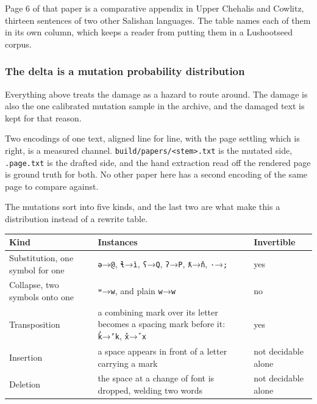 Page 6 of that paper is a comparative appendix in Upper Chehalis and Cowlitz, thirteen sentences of two other Salishan languages. The table names each of them in its own column, which keeps a reader from putting them in a Lushootseed corpus.

\subsubsection{The delta is a mutation probability distribution}

Everything above treats the damage as a hazard to route around. The damage is also the one calibrated mutation sample in the archive, and the damaged text is kept for that reason.

Two encodings of one text, aligned line for line, with the page settling which is right, is a measured channel. \texttt{build/\allowbreak{}papers/\allowbreak{}<stem>.\allowbreak{}txt} is the mutated side, \texttt{.\allowbreak{}page.\allowbreak{}txt} is the drafted side, and the hand extraction read off the rendered page is ground truth for both. No other paper here has a second encoding of the same page to compare against.

The mutations sort into five kinds, and the last two are what make this a distribution instead of a rewrite table.

\tiny
\setlength{\tabcolsep}{2pt}
\begin{longtable}{@{}>{\raggedright\arraybackslash}p{}>{\raggedright\arraybackslash}p{}>{\raggedright\arraybackslash}p{}@{}}
\toprule
Kind & Instances & Invertible \\
\midrule
Substitution, one symbol for one & \texttt{ə}→\texttt{@}, \texttt{ɬ}→\texttt{ì}, \texttt{ʕ}→\texttt{Q}, \texttt{ʔ}→\texttt{P}, \texttt{ƛ}→\texttt{ň}, \texttt{·}→\texttt{;} & yes \\
Collapse, two symbols onto one & \texttt{ʷ}→\texttt{w}, and plain \texttt{w}→\texttt{w} & no \\
Transposition & a combining mark over its letter becomes a spacing mark before it: \texttt{k̓}→\texttt{’k}, \texttt{x̌}→\texttt{ˇx} & yes \\
Insertion & a space appears in front of a letter carrying a mark & not decidable alone \\
Deletion & the space at a change of font is dropped, welding two words & not decidable alone \\
\bottomrule
\end{longtable}
\normalsize

